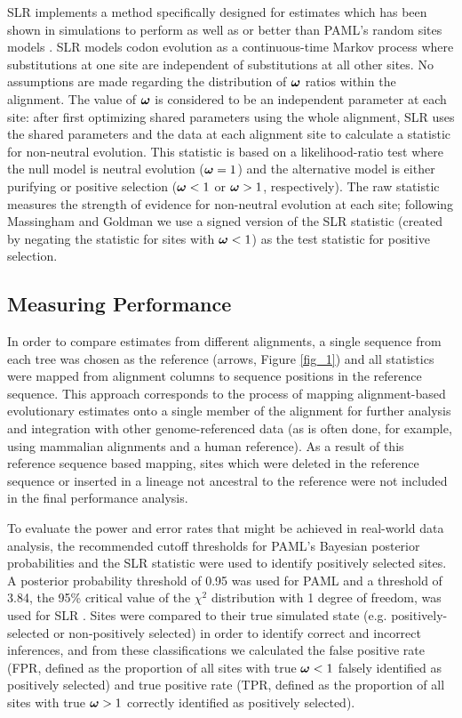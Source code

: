 \documentclass{article}
\begin{document}
SLR implements a method specifically designed for \sw estimates which
has been shown in simulations to perform as well as or better than
PAML's \sw random sites models \citep{Massingham2005Detecting}. SLR
models codon evolution as a continuous-time Markov process where
substitutions at one site are independent of substitutions at all
other sites. No assumptions are made regarding the
distribution of $\bm{\omega}$ ratios within the alignment. The value of
$\bm{\omega}$ is considered to be an independent parameter at each site:
after first optimizing shared parameters using the whole alignment,
SLR uses the shared parameters and the data at each alignment site to
calculate a \sw statistic for non-neutral evolution. This statistic is
based on a likelihood-ratio test where the null model is neutral
evolution ($\bm{\omega}=1$) and the alternative model is either purifying or
positive selection ($\bm{\omega}<1$ or $\bm{\omega}>1$, respectively). The raw
statistic measures the strength of evidence for non-neutral evolution
at each site; following Massingham and Goldman
\citeyearpar{Massingham2005Detecting} we use a signed version of the
SLR statistic (created by negating the statistic for sites with
$\bm{\omega}<1$) as the test statistic for positive selection.

\subsection*{Measuring Performance}

In order to compare \sw estimates from different alignments, a single
sequence from each tree was chosen as the reference (arrows, Figure
\ref{fig_1}) and all \sw statistics were mapped from alignment columns
to sequence positions in the reference sequence. This approach
corresponds to the process of mapping alignment-based evolutionary
estimates onto a single member of the alignment for further analysis
and integration with other genome-referenced data (as is often done,
for example, using mammalian alignments and a human reference). As a
result of this reference sequence based mapping, sites which were
deleted in the reference sequence or inserted in a lineage not
ancestral to the reference were not included in the final performance
analysis.

To evaluate the power and error rates that might be achieved in
real-world data analysis, the recommended cutoff thresholds for PAML's
Bayesian posterior probabilities and the SLR statistic were used to
identify positively selected sites. A posterior probability threshold
of 0.95 was used for PAML \citep{Yang2005Bayes} and a threshold of 3.84,
the 95\% critical value of the $\chi^2$ distribution with 1 degree
of freedom, was used for SLR \citep{Massingham2005Detecting}. Sites were
compared to their true simulated state (e.g. positively-selected or
non-positively selected) in order to identify correct and incorrect
inferences, and from these classifications we calculated the false
positive rate (FPR, defined as the proportion of all sites with true
$\bm{\omega}<1$ falsely identified as positively selected) and true positive rate
(TPR, defined as the proportion of all sites with true $\bm{\omega}>1$ correctly
identified as positively selected).
\end{document}
